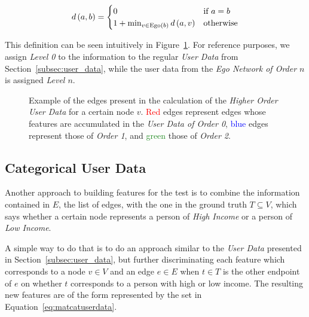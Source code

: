 \begin{equation}
d \left( a, b \right) =
\begin{cases}
	0 & \text{if } a = b \\
	1 + \min_{v \in \operatorname{Ego} \left(b \right)} d \left( a, v \right) & \text{otherwise}
\end{cases}
\label{eq:distance}
\end{equation}

This definition can be seen intuitively in Figure~\ref{fig:higherorderuserdata}. For reference purposes, we assign \emph{Level 0} to the information to the regular \emph{User Data} from Section~\ref{subsec:user_data}, while the user data from the \emph{Ego Network of Order $n$} is assigned \emph{Level $n$}\footnotemark{}.


\begin{figure}
\centering
\framebox[\columnwidth]{%
	
}
\caption{Example of the edges present in the calculation of the \emph{Higher Order User Data} for a certain node $v$. \textcolor{red}{Red} edges represent edges whose features are accumulated in the \emph{User Data of Order 0}, \textcolor{blue}{blue} edges represent those of \emph{Order 1}, and \textcolor{ForestGreen}{green} those of \emph{Order 2}.}
\label{fig:higherorderuserdata}
\end{figure}

\subsection{Categorical User Data}
\label{subsec:categoricaluserdata}

Another approach to building features for the test is to combine the information contained in $E$, the list of edges, with the one in the ground truth $T \subseteq V$, which says whether a certain node represents a person of \emph{High Income} or a person of \emph{Low Income}.

A simple way to do that is to do an approach similar to the \emph{User Data} presented in Section~\ref{subsec:user_data}, but further discriminating each feature which corresponds to a node $v \in V$ and an edge $e \in E$ when $t \in T$ is the other endpoint of $e$ on whether $t$ corresponds to a person with high or low income. The resulting new features are of the form represented by the set in Equation~\ref{eq:matcatuserdata}.

